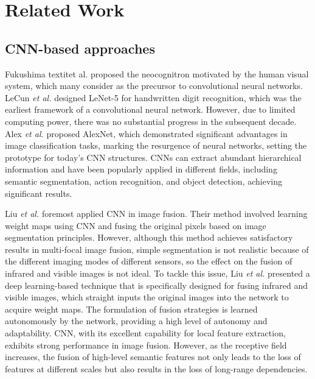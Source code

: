 \section{Related Work}
\label{related}
\noindent
\subsection{CNN-based approaches}
Fukushima textit{et al.} proposed the neocognitron motivated by the human visual system, which many consider as the precursor to convolutional neural networks.
LeCun \textit{et al.} \cite{lecun1989handwritten} designed LeNet-5 for handwritten digit recognition, which was the earliest framework of a convolutional neural network.
However, due to limited computing power, there was no substantial progress in the subsequent decade.
Alex \textit{et al.} \cite{krizhevsky2017imagenet} proposed AlexNet, which demonstrated significant advantages in image classification tasks, marking the resurgence of neural networks, setting the prototype for today's CNN structures.
CNNs can extract abundant hierarchical information and have been popularly applied in different fields, including semantic segmentation, action recognition, and object detection, achieving significant results.

Liu \textit{et al.} \cite{liu2017multi} foremost applied CNN in image fusion. Their method involved learning weight maps using CNN and fusing the original pixels based on image segmentation principles.
However, although this method achieves satisfactory results in multi-focal image fusion, simple segmentation is not realistic because of the different imaging modes of different sensors, so the effect on the fusion of infrared and visible images is not ideal.
To tackle this issue, Liu \textit{et al.} \cite{liu2018infrared} presented a deep learning-based technique that is specifically designed for fusing infrared and visible images, which straight inputs the original images into the network to acquire weight maps.
The formulation of fusion strategies is learned autonomously by the network, providing a high level of autonomy and adaptability.
CNN, with its excellent capability for local feature extraction, exhibits strong performance in image fusion.
However, as the receptive field increases, the fusion of high-level semantic features not only leads to the loss of features at different scales but also results in the loss of long-range dependencies.

